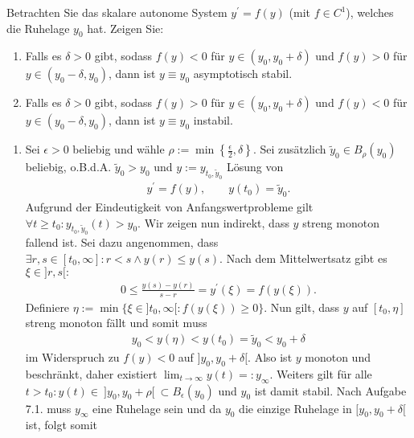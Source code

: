 \begin{exercise}
Betrachten Sie das skalare autonome System $y^{\prime} = f(y)$ (mit $f \in C^1$),
welches die Ruhelage $y_0$ hat. Zeigen Sie:
\begin{enumerate}[label = \textbf{\alph*)}]
  \item Falls es $\delta > 0$ gibt, sodass $f(y) < 0$ für $y \in (y_0,y_0 + \delta)$
und $f(y) > 0$ für $y \in (y_0 - \delta, y_0)$, dann ist $y \equiv y_0$
asymptotisch stabil.
\item Falls es $\delta > 0$ gibt, sodass $f(y) > 0$ für $y \in (y_0,y_0 + \delta)$
und $f(y) < 0$ für $y \in (y_0 - \delta, y_0)$, dann ist $y \equiv y_0$ instabil.
\end{enumerate}
\end{exercise}
\begin{solution}
  \phantom{}
\begin{enumerate}[label = \textbf{\alph*)}]
\item Sei $\epsilon > 0$ beliebig und wähle
$\rho := \min \left\{\frac{\epsilon}{2}, \delta \right\}$.
Sei zusätzlich $\widetilde{y}_0 \in B_{\rho}(y_0)$ beliebig, o.B.d.A. $\widetilde{y}_0 > y_0$
und $y := y_{t_0,\widetilde{y}_0}$ Lösung von
\begin{align*}
  y^{\prime} = f(y), \qquad y(t_0) = \widetilde{y}_0.
\end{align*}
Aufgrund der Eindeutigkeit von Anfangswertprobleme gilt
$\forall t \geq t_0: y_{t_0,\widetilde{y}_0}(t) > y_0$.
Wir zeigen nun indirekt, dass $y$ streng monoton fallend ist.
Sei dazu angenommen, dass $\exists r,s \in [t_0,\infty]: r < s \land y(r) \leq y(s)$.
Nach dem Mittelwertsatz gibt es $\xi \in ]r,s[:$
\begin{align*}
  0 \leq \frac{y(s)-y(r)}{s-r} = y^{\prime}(\xi) = f(y(\xi)).
\end{align*}
Definiere $\eta := \min \{\xi \in ]t_0,\infty[: f(y(\xi)) \geq 0 \}$.
Nun gilt, dass $y$ auf $[t_0, \eta]$ streng monoton fällt und somit muss
\begin{align*}
  y_0 < y(\eta) < y(t_0) = \widetilde{y}_0 < y_0 + \delta
\end{align*}
im Widerspruch zu $f(y) < 0$ auf $]y_0,y_0 + \delta[$.
Also ist $y$ monoton und beschränkt, daher existiert $\lim_{t \to \infty} y(t) =: y_{\infty}$.
Weiters gilt für alle $t > t_0: y(t) \in ~]y_0, y_0 + \rho[~ \subset B_{\epsilon}(y_0)$
und $y_0$ ist damit stabil.
Nach Aufgabe 7.1. muss $y_{\infty}$ eine Ruhelage sein und da $y_0$ die einzige
Ruhelage in $[y_0,y_0 + \delta[$ ist, folgt somit
\begin{align*}

\end{align*}
\end{enumerate}
\end{solution}
